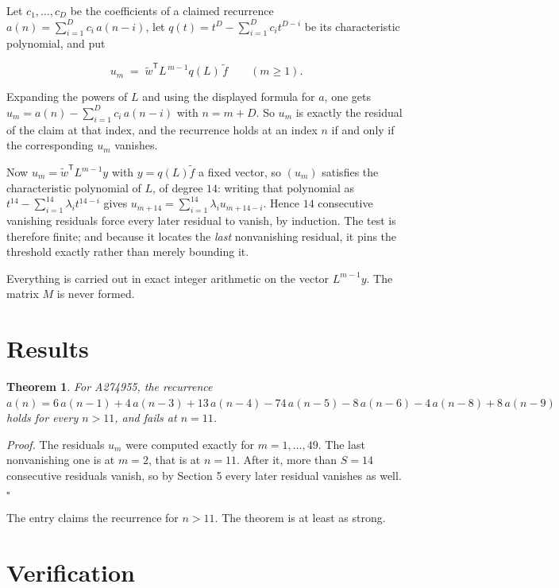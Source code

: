 \documentclass[11pt]{article}
\newtheorem{theorem}{Theorem}
\theoremstyle{definition}
\begin{document}
Let $c_1,\dots,c_D$ be the coefficients of a claimed recurrence $a(n) = \sum_{i=1}^{D} c_i\,a(n-i)$, let $q(t) = t^{D} - \sum_{i=1}^{D} c_i t^{D-i}$ be its characteristic polynomial, and put

\[u_m \;=\; \tilde w^{\mathsf T} L^{\,m-1} q(L)\,\tilde f \qquad (m \ge 1).\]

Expanding the powers of $L$ and using the displayed formula for $a$, one gets $u_m = a(n) - \sum_{i=1}^{D} c_i\,a(n-i)$ with $n = m + D$. So $u_m$ is exactly the residual of the claim at that index, and the recurrence holds at an index $n$ if and only if the corresponding $u_m$ vanishes.

Now $u_m = \tilde w^{\mathsf T} L^{m-1} y$ with $y = q(L)\tilde f$ a fixed vector, so $(u_m)$ satisfies the characteristic polynomial of $L$, of degree $14$: writing that polynomial as $t^{14} - \sum_{i=1}^{14} \lambda_i t^{14-i}$ gives $u_{m+14} = \sum_{i=1}^{14} \lambda_i u_{m+14-i}$. Hence $14$ consecutive vanishing residuals force every later residual to vanish, by induction. The test is therefore finite; and because it locates the {\itshape last} nonvanishing residual, it pins the threshold exactly rather than merely bounding it.

Everything is carried out in exact integer arithmetic on the vector $L^{m-1}y$. The matrix $M$ is never formed.

\section{Results}

\begin{theorem} For A274955, the recurrence $a(n) = 6\,a(n-1) + 4\,a(n-3) + 13\,a(n-4) - 74\,a(n-5) - 8\,a(n-6) - 4\,a(n-8) + 8\,a(n-9)$ holds for every $n > 11$, and fails at $n = 11$.\end{theorem}

{\itshape Proof.} The residuals $u_m$ were computed exactly for $m = 1,\dots,49$. The last nonvanishing one is at $m = 2$, that is at $n = 11$. After it, more than $S = 14$ consecutive residuals vanish, so by Section 5 every later residual vanishes as well. $\square$

The entry claims the recurrence for $n > 11$. The theorem is at least as strong.

\section{Verification}
\end{document}
